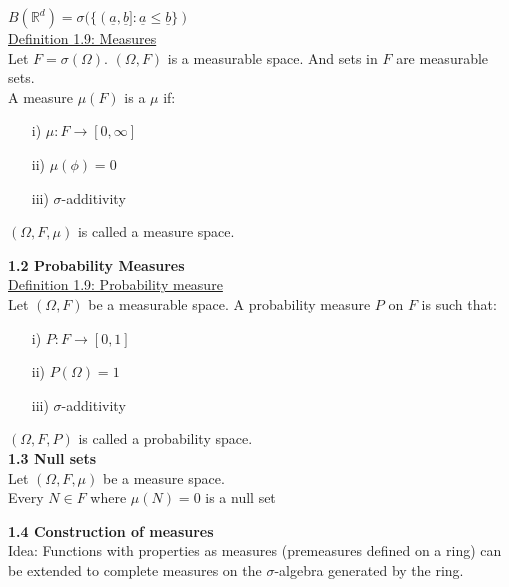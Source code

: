 \documentclass[10pt,letterpaper]{article}
\begin{document}
$B(\mathbb{R}^d) = \sigma(\{(\underline{a}, \underline{b}]: \underline{a}\leq \underline{b}\})$\\

\underline{Definition 1.9: Measures}\\

Let $F = \sigma(\Omega)$. $(\Omega, F)$ is a measurable space. And sets in $F$ are measurable sets.\\

A measure $\mu(F)$ is a $\mu$ if:

\begin{enumerate}
\item[i)] $\mu: F\rightarrow [0,\infty]$
\item[ii)] $\mu(\phi) = 0$
\item[iii)] $\sigma$-additivity
\end{enumerate}

$(\Omega, F, \mu)$ is called a measure space.\\

\pagebreak

\textbf{1.2 Probability Measures}\\

\underline{Definition 1.9: Probability measure}\\

Let $(\Omega, F)$ be a measurable space. A probability measure $P$ on $F$ is such that:

\begin{enumerate}
\item[i)] $P: F\rightarrow [0,1]$
\item[ii)] $P(\Omega) = 1$
\item[iii)] $\sigma$-additivity
\end{enumerate}

$(\Omega, F, P)$ is called a probability space.\\

\textbf{1.3 Null sets}\\

Let $(\Omega, F, \mu)$ be a measure space.\\

Every $N\in F$ where $\mu(N)=0$ is a null set\\

\pagebreak

\textbf{1.4 Construction of measures}\\

Idea: Functions with properties as measures (premeasures defined on a ring) can be extended
to complete measures on the $\sigma$-algebra generated by the ring.\\
\end{document}
